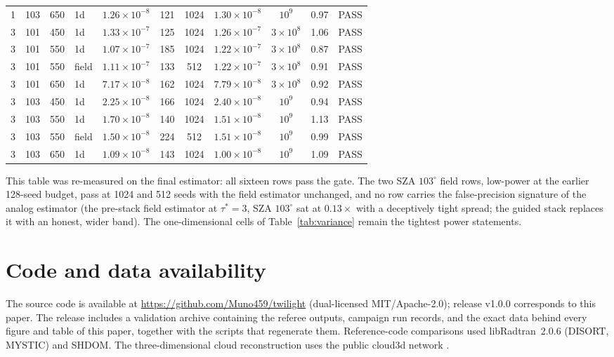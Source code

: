 \documentclass[preprint,12pt]{elsarticle}
\begin{document}
\begin{table}[h]
\begin{tabular}{ccclccccccl}
1 & 103 & 650 & 1d & $1.26\times10^{-8}$ & 121 & 1024 & $1.30\times10^{-8}$ & $10^{9}$ & 0.97 & PASS \\
3 & 101 & 450 & 1d & $1.33\times10^{-7}$ & 125 & 1024 & $1.26\times10^{-7}$ & $3\times10^{8}$ & 1.06 & PASS \\
3 & 101 & 550 & 1d & $1.07\times10^{-7}$ & 185 & 1024 & $1.22\times10^{-7}$ & $3\times10^{8}$ & 0.87 & PASS \\
3 & 101 & 550 & field & $1.11\times10^{-7}$ & 133 & 512 & $1.22\times10^{-7}$ & $3\times10^{8}$ & 0.91 & PASS \\
3 & 101 & 650 & 1d & $7.17\times10^{-8}$ & 162 & 1024 & $7.79\times10^{-8}$ & $3\times10^{8}$ & 0.92 & PASS \\
3 & 103 & 450 & 1d & $2.25\times10^{-8}$ & 166 & 1024 & $2.40\times10^{-8}$ & $10^{9}$ & 0.94 & PASS \\
3 & 103 & 550 & 1d & $1.70\times10^{-8}$ & 140 & 1024 & $1.51\times10^{-8}$ & $10^{9}$ & 1.13 & PASS \\
3 & 103 & 550 & field & $1.50\times10^{-8}$ & 224 & 512 & $1.51\times10^{-8}$ & $10^{9}$ & 0.99 & PASS \\
3 & 103 & 650 & 1d & $1.09\times10^{-8}$ & 143 & 1024 & $1.00\times10^{-8}$ & $10^{9}$ & 1.09 & PASS \\
\bottomrule
\end{tabular}
\end{table}

This table was re-measured on the final estimator: all sixteen rows
pass the gate. The two SZA $103^{\circ}$ field rows, low-power at the
earlier 128-seed budget, pass at 1024 and 512 seeds with the field
estimator unchanged, and no row carries the false-precision
signature of the analog estimator
(the pre-stack field estimator at $\tau^{*}=3$, SZA $103^{\circ}$ sat
at $0.13\times$ with a deceptively tight spread; the guided stack
replaces it with an honest, wider band). The one-dimensional cells of
Table~\ref{tab:variance} remain the tightest power statements.

\section*{Code and data availability}

The source code is available at
\url{https://github.com/Muno459/twilight} (dual-licensed
MIT/Apache-2.0); release v1.0.0 corresponds to this paper. The release
includes a validation archive containing the referee outputs, campaign
run records, and the exact data behind every figure and table of this
paper, together with the scripts that regenerate them.
Reference-code comparisons used libRadtran~2.0.6 (DISORT, MYSTIC) and
SHDOM. The three-dimensional cloud reconstruction uses the public
cloud3d network \citep{aybar2025}.
\end{document}
